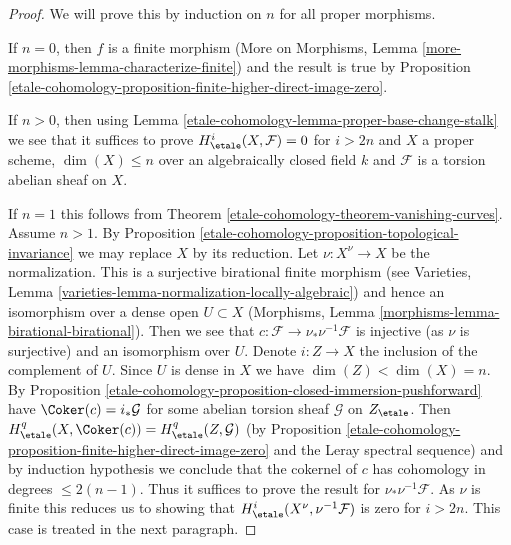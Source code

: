\begin{proof}
We will prove this by induction on $n$ for all proper morphisms.

\medskip\noindent
If $n = 0$, then $f$ is a finite morphism
(More on Morphisms, Lemma \ref{more-morphisms-lemma-characterize-finite})
and the
result is true by Proposition \ref{etale-cohomology-proposition-finite-higher-direct-image-zero}.

\medskip\noindent
If $n > 0$, then using Lemma \ref{etale-cohomology-lemma-proper-base-change-stalk}
we see that it suffices to prove $H^i_\etale(X, \mathcal{F}) = 0$
for $i > 2n$ and $X$ a proper scheme, $\dim(X) \leq n$
over an algebraically closed field $k$
and $\mathcal{F}$ is a torsion abelian sheaf on $X$.

\medskip\noindent
If $n = 1$ this follows from Theorem \ref{etale-cohomology-theorem-vanishing-curves}.
Assume $n > 1$. By Proposition \ref{etale-cohomology-proposition-topological-invariance}
we may replace $X$ by its reduction.
Let $\nu : X^\nu \to X$ be the normalization.
This is a surjective birational finite morphism
(see Varieties, Lemma \ref{varieties-lemma-normalization-locally-algebraic})
and hence an isomorphism over a dense open $U \subset X$
(Morphisms, Lemma \ref{morphisms-lemma-birational-birational}).
Then we see that
$c : \mathcal{F} \to \nu_*\nu^{-1}\mathcal{F}$ is injective
(as $\nu$ is surjective) and an isomorphism over $U$.
Denote $i : Z \to X$ the inclusion of the complement of $U$.
Since $U$ is dense in $X$ we have $\dim(Z) < \dim(X) = n$.
By Proposition \ref{etale-cohomology-proposition-closed-immersion-pushforward} have
$\Coker(c) = i_*\mathcal{G}$ for some
abelian torsion sheaf $\mathcal{G}$ on $Z_\etale$.
Then $H^q_\etale(X, \Coker(c)) = H^q_\etale(Z, \mathcal{G})$
(by Proposition \ref{etale-cohomology-proposition-finite-higher-direct-image-zero}
and the Leray spectral sequence) and by induction hypothesis we conclude that
the cokernel of $c$ has cohomology in degrees $\leq 2(n - 1)$.
Thus it suffices to prove the result for $\nu_*\nu^{-1}\mathcal{F}$.
As $\nu$ is finite this reduces us to showing
that $H^i_\etale(X^\nu, \nu^{-1}\mathcal{F})$ is
zero for $i > 2n$. This case is treated in the next paragraph.


\end{proof}
